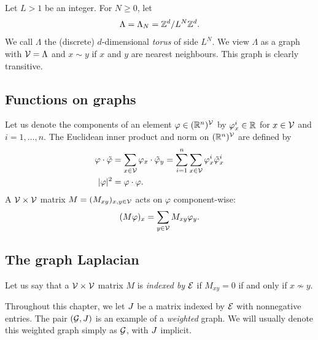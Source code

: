 \begin{example}
Let $L > 1$ be an integer. For $N \ge 0$, let
\begin{equation}
\label{e:Lambda-torus}
\Lambda = \Lambda_N = { {{\mathbb Z}}^d }/L^N{ {{\mathbb Z}}^d }.
\end{equation}
We call $\Lambda$ the (discrete) $d$-dimensional \emph{torus} of side $L^N$.
We view $\Lambda$ as a graph with $\mathcal{V} = \Lambda$ and $x \sim y$ if
$x$ and $y$ are nearest neighbours. This graph is clearly transitive.
\end{example}


\subsection{Functions on graphs}

Let us denote the components of an element $\varphi \in ({\mathbb R}^n)^{\mathcal{V}}$ by
$\varphi^i_x \in {\mathbb R}$ for $x \in \mathcal{V}$ and $i = 1, \ldots, n$.
The Euclidean inner product and norm on $({\mathbb R}^n)^{\mathcal{V}}$
are defined by
\begin{align}
\varphi\cdot\tilde\varphi
	&= \sum_{x\in\mathcal{V}} \varphi_x \cdot \tilde\varphi_y
  		= \sum_{i=1}^n \sum_{x\in\mathcal{V}} \varphi^i_x \tilde\varphi^i_x \\
|\varphi|^2
	&= \varphi \cdot \varphi.
\end{align}
A $\mathcal{V}\times\mathcal{V}$ matrix $M = (M_{xy})_{x,y\in\mathcal{V}}$ acts on $\varphi$
component-wise:
\begin{equation}
(M \varphi)_x = \sum_{y\in\mathcal{V}} M_{xy} \varphi_y.
\end{equation}


\subsection{The graph Laplacian}

Let us say that a $\mathcal{V}\times\mathcal{V}$ matrix $M$ is \emph{indexed by} $\mathcal{E}$
if $M_{xy} = 0$ if and only if $x \not\sim y$.

Throughout this chapter, we let $J$ be a matrix indexed by $\mathcal{E}$ with nonnegative entries.
The pair $(\mathcal{G}, J)$ is an example of a \emph{weighted} graph.
We will usually denote this weighted graph simply as $\mathcal{G}$, with $J$
implicit.

